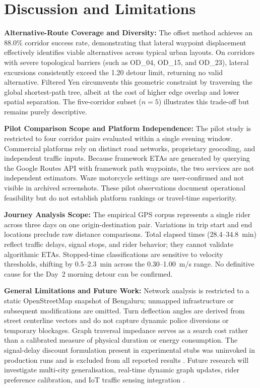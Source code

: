 \documentclass[11pt,conference]{IEEEtran}
\begin{document}

\section{Discussion and Limitations}

\noindent\textbf{Alternative-Route Coverage and Diversity:}
The offset method achieves an 88.0\% corridor success rate, demonstrating that lateral waypoint displacement effectively identifies viable alternatives across typical urban layouts.
On corridors with severe topological barriers (such as OD\_04, OD\_15, and OD\_23), lateral excursions consistently exceed the 1.20 detour limit, returning no valid alternative.
Filtered Yen circumvents this geometric constraint by traversing the global shortest-path tree, albeit at the cost of higher edge overlap and lower spatial separation.
The five-corridor subset ($n=5$) illustrates this trade-off but remains purely descriptive.

\noindent\textbf{Pilot Comparison Scope and Platform Independence:}
The pilot study is restricted to four corridor pairs evaluated within a single evening window.
Commercial platforms rely on distinct road networks, proprietary geocoding, and independent traffic inputs.
Because framework ETAs are generated by querying the Google Routes API with framework path waypoints, the two services are not independent estimators.
Waze motorcycle settings are user-confirmed and not visible in archived screenshots.
These pilot observations document operational feasibility but do not establish platform rankings or travel-time superiority.

\noindent\textbf{Journey Analysis Scope:}
The empirical GPS corpus represents a single rider across three days on one origin-destination pair.
Variations in trip start and end locations preclude raw distance comparisons.
Total elapsed times (28.4--34.8~min) reflect traffic delays, signal stops, and rider behavior; they cannot validate algorithmic ETAs.
Stopped-time classifications are sensitive to velocity thresholds, shifting by 0.5--2.3~min across the 0.30--1.00~m/s range.
No definitive cause for the Day~2 morning detour can be confirmed.

\noindent\textbf{General Limitations and Future Work:}
Network analysis is restricted to a static OpenStreetMap snapshot of Bengaluru; unmapped infrastructure or subsequent modifications are omitted.
Turn deflection angles are derived from street centerline vectors and do not capture dynamic police diversions or temporary blockages.
Graph traversal impedance serves as a search cost rather than a calibrated measure of physical duration or energy consumption.
The signal-delay discount formulation present in experimental stubs was uninvoked in production runs and is excluded from all reported results \cite{promraksa2022lane,abbas2019internet}.
Future research will investigate multi-city generalisation, real-time dynamic graph updates, rider preference calibration, and IoT traffic sensing integration \cite{abbas2019internet}.
\end{document}
